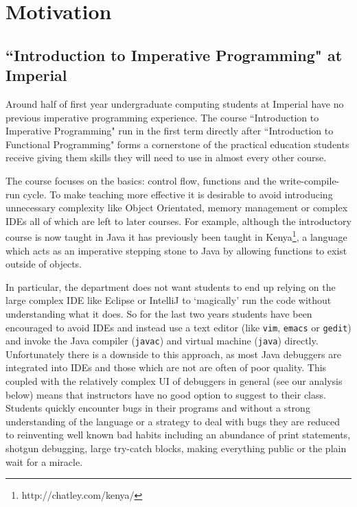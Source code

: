 \documentclass[11pt, a4paper]{article}
\newcommand{\cmd}[1]{{\tt #1}}
\begin{document}
\clearpage
\tableofcontents
\clearpage

\section{Motivation}
\subsection{``Introduction to Imperative Programming" at Imperial}
Around half of first year undergraduate computing students at Imperial have no previous imperative programming experience\cite{projectproposal}.
The course ``Introduction to Imperative Programming" run in the first term directly after ``Introduction to Functional Programming" forms a cornerstone of the practical education students receive giving them skills they will need to use in almost every other course.

The course focuses on the basics: control flow, functions and the write-compile-run cycle.
To make teaching more effective it is desirable to avoid introducing unnecessary complexity like Object Orientated, memory management or complex IDEs all of which are left to later courses.
For example, although the introductory course is now taught in Java it has previously been taught in Kenya\footnote{http://chatley.com/kenya/}, a language which acts as an imperative stepping stone to Java by allowing functions to exist outside of objects.

In particular, the department does not want students to end up relying on the large complex IDE like Eclipse or IntelliJ to `magically' run the code without understanding what it does.
So for the last two years students have been encouraged to avoid IDEs and instead use a text editor (like \cmd{vim}, \cmd{emacs} or \cmd{gedit}) and invoke the Java compiler (\cmd{javac}) and virtual machine (\cmd{java}) directly.
Unfortunately there is a downside to this approach, as most Java debuggers are integrated into IDEs and those which are not are often of poor quality. This coupled with the relatively complex UI of debuggers in general (see our analysis below) means that instructors have no good option to suggest to their class.
Students quickly encounter bugs in their programs and without a strong understanding of the language or a strategy to deal with bugs they are reduced to reinventing well known bad habits including an abundance of print statements, shotgun debugging, large try-catch blocks, making everything public or the plain wait for a miracle.
\end{document}

